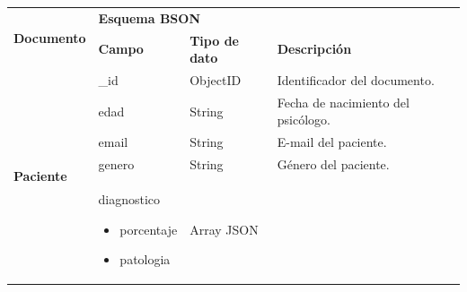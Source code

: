 \begin{table}[htpb]
\centering
\begin{tabularx}{\textwidth}{|l|X|X|X|X|}
\hline
\multirow{2}{*}{\textbf{Documento}} & \multicolumn{3}{l|}{\textbf{Esquema BSON}}                                                                                                                                                                                                           \\ \cline{2-4} 
                                    & \textbf{Campo}                       & \textbf{Tipo de dato}      & \textbf{Descripción}                                                                                                                                                             \\ \hline
\multirow{9}{*}{\textbf{Paciente}}  & \_id                                 & ObjectID                   & Identificador del documento.                                                                                                                                                     \\ \cline{2-4} 
                                    & edad                                 & String                     & Fecha de nacimiento del psicólogo.                                                                                                                                               \\ \cline{2-4} 
                                    & email                                & String                     & E-mail del paciente.                                                                                                                                                             \\ \cline{2-4} 
                                    & genero                               & String                     & Género del paciente.                                                                                                                                                             \\ \cline{2-4} 
                                    & diagnostico \begin{itemize}
                                    \item porcentaje
                                    \item patologia
                                    \end{itemize}   & Array JSON \begin{itemize}

\end{itemize}
\end{tabularx}
\end{table}
